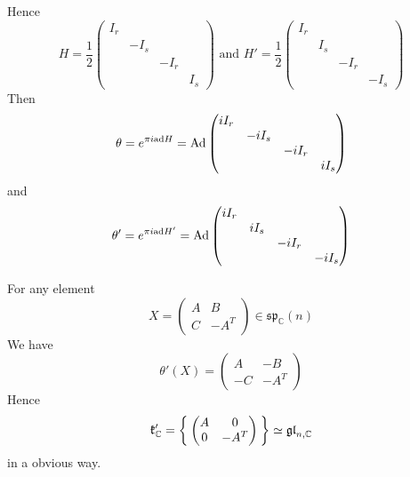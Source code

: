 \documentclass[12pt]{amsart}
\def\bC{{\mathbb{C}}}
\def\sp{{\mathfrak{sp}}}
\def\ad{{\rm ad}}
\def\Ad{{\rm Ad}}
\def\Ad{\mathrm{Ad}}
\def\agl{\mathfrak{gl}}
\def\fkk{\mathfrak{k}}
\begin{document}
Hence 
\[
H = \frac{1}{2} \begin{pmatrix}
I_r & & & \\
 & -I_s & & \\
 & & -I_r & \\
 & & & I_s 
\end{pmatrix}
\text{ and }
H' = \frac{1}{2} 
\begin{pmatrix}
I_r & & & \\
 & I_s & & \\
 & & -I_r & \\
 & & & -I_s 
\end{pmatrix}
\]
Then 
\[
\theta = e^{\pi i \ad H} =\Ad \begin{pmatrix}
iI_r & & & \\
 & -iI_s & & \\
 & & -iI_r & \\
 & & & iI_s 
\end{pmatrix}
\]
and
\[
\theta' = e^{\pi i \ad H'} = \Ad \begin{pmatrix}
iI_r & & & \\
 & iI_s & & \\
 & & -iI_r & \\
 & & & -iI_s 
\end{pmatrix}
\]

For any element 
\[ X = 
\begin{pmatrix}
A & B \\
C & -A^T 
\end{pmatrix} \in \sp_\bC(n)
\]
We have 
\[
\theta'(X) = \begin{pmatrix}
A & -B\\
-C & -A^T
\end{pmatrix}
\]
Hence 
\[
\fkk_\bC' = \Set{\begin{pmatrix}
A & 0 \\
0 & -A^T 
\end{pmatrix}} \simeq \agl_{n, \bC}  
\]
in a obvious way. 
\end{document}
